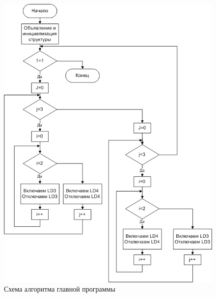 \begin{figure}[H]
\begin{center}
\includegraphics[scale=0.6]{Image/78.jpg} 
\end{center}
\caption{Схема алгоритма главной программы}
\end{figure}

